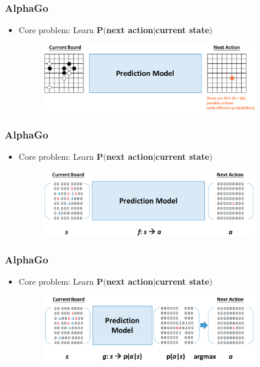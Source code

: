 \documentclass{beamer}
\begin{document}
\begin{frame}
\frametitle{AlphaGo}
\begin{itemize}
\item Core problem: Learn $\mathbf{P(}$\textbf{next action}$ | $\textbf{current state}$\mathbf{)}$
\begin{figure}
      \includegraphics[width=0.9\textwidth]{figs/alphago2.png}
\end{figure}
\end{itemize}
\end{frame}

\begin{frame}
\frametitle{AlphaGo}
\begin{itemize}
\item Core problem: Learn $\mathbf{P(}$\textbf{next action}$ | $\textbf{current state}$\mathbf{)}$
\begin{figure}
      \includegraphics[width=0.9\textwidth]{figs/alphago3.png}
\end{figure}
\end{itemize}
\end{frame}

\begin{frame}
\frametitle{AlphaGo}
\begin{itemize}
\item Core problem: Learn $\mathbf{P(}$\textbf{next action}$ | $\textbf{current state}$\mathbf{)}$
\begin{figure}
      \includegraphics[width=0.9\textwidth]{figs/alphago4.png}
\end{figure}
\end{itemize}
\end{frame}
\end{document}
